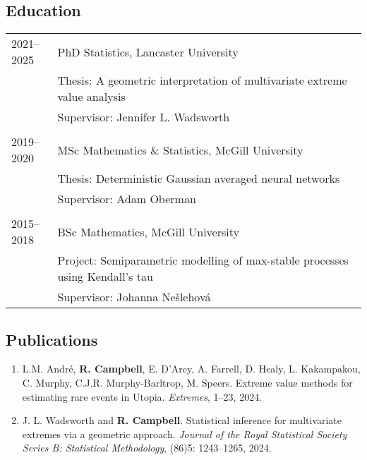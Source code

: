 \documentclass[11pt,]{scrartcl}
\begin{document}
\subsection{Education}\label{education}

\begin{table}[h]
{\def\arraystretch{1.1}\tabcolsep=0pt
\begin{tabular}{p{0.13\linewidth}p{0.87\linewidth}}

  {2021--2025} & PhD Statistics, Lancaster University \\
  & Thesis: A geometric interpretation of multivariate extreme value analysis\\
  & Supervisor: Jennifer L. Wadsworth \\ \\
  
  {2019--2020}  & MSc Mathematics \& Statistics, McGill University \\
  & Thesis: Deterministic Gaussian averaged neural networks \\
  & Supervisor: Adam Oberman \\  \\

  2015--2018 & BSc Mathematics, McGill University \\
  & Project: Semiparametric modelling of max-stable processes using Kendall's tau \\
  & Supervisor: Johanna Ne\v{s}lehov\'{a} \\

\end{tabular}%
}
\end{table}


\subsection{Publications}
\begin{enumerate}
  \leftskip-0.13in %
  \item L.M. André, \textbf{R. Campbell}, E. D'Arcy, A. Farrell, D. Healy, L. Kakampakou, C. Murphy, C.J.R. Murphy-Barltrop, M. Speers. Extreme value methods for estimating rare events in Utopia. \emph{Extremes}, 1--23, 2024.
  \item J. L. Wadsworth and \textbf{R. Campbell}. Statistical inference for multivariate extremes via a geometric approach. \emph{Journal of the Royal Statistical Society Series B: Statistical Methodology}, (86)5: 1243--1265, 2024.
\end{enumerate}
\end{document}
